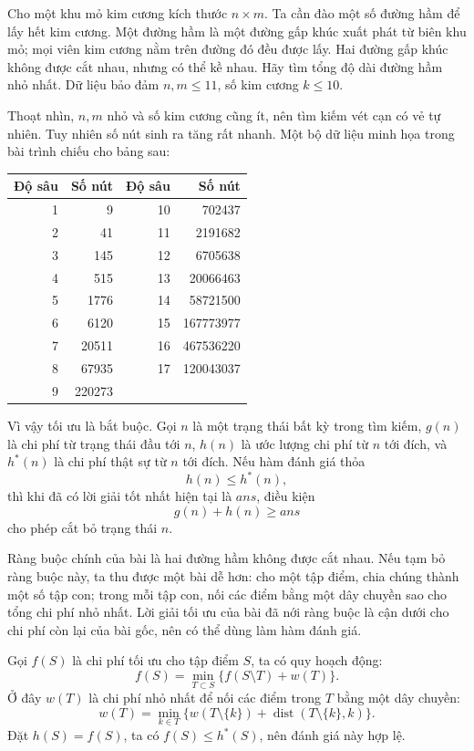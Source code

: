\documentclass[11pt]{article}
\newcommand{\dist}{\operatorname{dist}}
\begin{document}
Cho một khu mỏ kim cương kích thước \(n\times m\). Ta cần đào một số đường hầm
để lấy hết kim cương. Một đường hầm là một đường gấp khúc xuất phát từ biên
khu mỏ; mọi viên kim cương nằm trên đường đó đều được lấy. Hai đường gấp khúc
không được cắt nhau, nhưng có thể kề nhau. Hãy tìm tổng độ dài đường hầm nhỏ
nhất. Dữ liệu bảo đảm \(n,m\le 11\), số kim cương \(k\le 10\).

Thoạt nhìn, \(n,m\) nhỏ và số kim cương cũng ít, nên tìm kiếm vét cạn có vẻ
tự nhiên. Tuy nhiên số nút sinh ra tăng rất nhanh. Một bộ dữ liệu minh họa
trong bài trình chiếu cho bảng sau:

\begin{center}
\begin{tabular}{r|r@{\qquad}r|r}
\textbf{Độ sâu} & \textbf{Số nút} & \textbf{Độ sâu} & \textbf{Số nút}\\
\hline
1 & 9 & 10 & 702437\\
2 & 41 & 11 & 2191682\\
3 & 145 & 12 & 6705638\\
4 & 515 & 13 & 20066463\\
5 & 1776 & 14 & 58721500\\
6 & 6120 & 15 & 167773977\\
7 & 20511 & 16 & 467536220\\
8 & 67935 & 17 & 120043037\\
9 & 220273 & & \\
\end{tabular}
\end{center}

Vì vậy tối ưu là bắt buộc. Gọi \(n\) là một trạng thái bất kỳ trong tìm kiếm,
\(g(n)\) là chi phí từ trạng thái đầu tới \(n\), \(h(n)\) là ước lượng chi phí
từ \(n\) tới đích, và \(h^*(n)\) là chi phí thật sự từ \(n\) tới đích. Nếu hàm
đánh giá thỏa
\[
  h(n)\le h^*(n),
\]
thì khi đã có lời giải tốt nhất hiện tại là \(\mathit{ans}\), điều kiện
\[
  g(n)+h(n)\ge \mathit{ans}
\]
cho phép cắt bỏ trạng thái \(n\).

Ràng buộc chính của bài là hai đường hầm không được cắt nhau. Nếu tạm bỏ ràng
buộc này, ta thu được một bài dễ hơn: cho một tập điểm, chia chúng thành một
số tập con; trong mỗi tập con, nối các điểm bằng một dây chuyền sao cho tổng
chi phí nhỏ nhất. Lời giải tối ưu của bài đã nới ràng buộc là cận dưới cho
chi phí còn lại của bài gốc, nên có thể dùng làm hàm đánh giá.

Gọi \(f(S)\) là chi phí tối ưu cho tập điểm \(S\), ta có quy hoạch động:
\[
  f(S)=\min_{T\subset S}\{f(S\setminus T)+w(T)\}.
\]
Ở đây \(w(T)\) là chi phí nhỏ nhất để nối các điểm trong \(T\) bằng một dây
chuyền:
\[
  w(T)=\min_{k\in T}\{w(T\setminus\{k\})+\dist(T\setminus\{k\},k)\}.
\]
Đặt \(h(S)=f(S)\), ta có \(f(S)\le h^*(S)\), nên đánh giá này hợp lệ.
\end{document}

